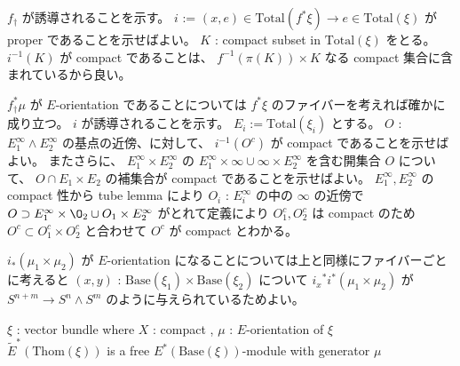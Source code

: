 \documentclass[dvipdfmx]{jsarticle}
\begin{document}
\begin{Proof}
\itemprof
  \(f_\dagger\) が誘導されることを示す。
  \(i\) := \((x,e) \in \text{Total}(f^* \xi) \to e \in \text{Total}(\xi)\) が proper であることを示せばよい。
  \(K\) : compact subset in \(\text{Total}(\xi)\) をとる。
  \(i^{-1}(K)\) が compact であることは、 \(f^{-1}(\pi(K)) \times K\) なる compact 集合に含まれているから良い。

  \(f_{\dagger}^* \mu\) が \(E\)-orientation であることについては \(f^*\xi\) のファイバーを考えれば確かに成り立つ。
\itemprof
  \(i\) が誘導されることを示す。
  \(E_i := \text{Total}(\xi_i)\) とする。
  \(O\) : \(E_1^\infty \wedge E_2^\infty\) の基点の近傍、に対して、 \(i^{-1}(O^c)\) が compact であることを示せばよい。
  またさらに、 \(E_1^\infty \times E_2^\infty\) の \(E_1^\infty \times \infty \cup \infty \times E_2^\infty\) を含む開集合 \(O\) について、 \(O \cap E_1 \times E_2\) の補集合が compact であることを示せばよい。
  \(E_1^\infty , E_2^\infty\) の compact 性から tube lemma により \(O_i\) : \(E_i^\infty\) の中の \(\infty\) の近傍で \(O \supset E_1^\infty \times \O_2\cup O_1 \times E_2^\infty\) がとれて定義により \(O_1^c, O_2^c\) は compact のため \(O^c \subset O_1^c \times O_2^c\) と合わせて \(O^c\) が compact とわかる。

  \(i_*(\mu_1 \times \mu_2)\) が \(E\)-orientation になることについては上と同様にファイバーごとに考えると \((x,y)\) : \(\text{Base}(\xi_1) \times \text{Base}(\xi_2)\) について \({i_x}^* i^*(\mu_1 \times \mu_2)\) が \(S^{n+m} \to S^n \wedge S^m\) のように与えられているためよい。
\end{Proof}

\begin{Theorem}
\itemprop
  \For \(\xi\) : vector bundle where \(X\) : compact , \(\mu\) : \(E\)-orientation of \(\xi\) \\
  \Then \(\tilde{E}^{*}(\text{Thom}(\xi))\) is a free \(E^{*}(\text{Base}(\xi))\)-module with generator \(\mu\)
\end{Theorem}
\end{document}
